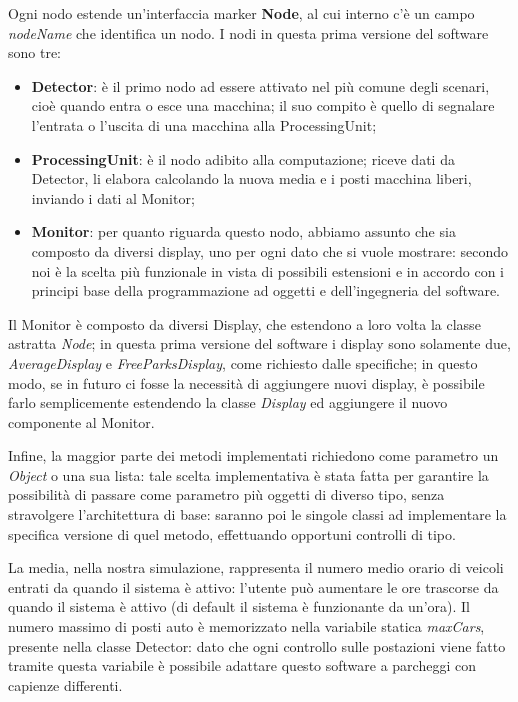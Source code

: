 \documentclass[a4paper,10pt]{article}
\begin{document}
Ogni nodo estende un'interfaccia marker \textbf{Node}, al cui interno c'è un campo \textit{nodeName} che identifica un nodo. I nodi in questa prima versione del software sono tre: 
\begin{itemize}
\item \textbf{Detector}: è il primo nodo ad essere attivato nel più comune degli scenari, cioè quando entra o esce una macchina; il suo compito è quello di segnalare l'entrata o l'uscita di una macchina alla ProcessingUnit;
\item \textbf{ProcessingUnit}: è il nodo adibito alla computazione; riceve dati da Detector, li elabora calcolando la nuova media e i posti macchina liberi, inviando i dati al Monitor;
\item \textbf{Monitor}: per quanto riguarda questo nodo, abbiamo assunto che sia composto da diversi display, uno per ogni dato che si vuole mostrare: secondo noi è la scelta più funzionale in vista di possibili estensioni e in accordo con i principi base della programmazione ad oggetti e dell'ingegneria del software.
\end{itemize}

Il Monitor è composto da diversi Display, che estendono a loro volta la classe astratta \textit{Node}; in questa prima versione del software i display sono solamente due, \textit{AverageDisplay} e \textit{FreeParksDisplay}, come richiesto dalle specifiche; in questo modo, se in futuro ci fosse la necessità di aggiungere nuovi display, è possibile farlo semplicemente estendendo la classe \textit{Display} ed aggiungere il nuovo componente al Monitor.

Infine, la maggior parte dei metodi implementati richiedono come parametro un \textit{Object} o una sua lista: tale scelta implementativa è stata fatta per garantire la possibilità di passare come parametro più oggetti di diverso tipo, senza stravolgere l'architettura di base: saranno poi le singole classi ad implementare la specifica versione di quel metodo, effettuando opportuni controlli di tipo.

La media, nella nostra simulazione, rappresenta il numero medio orario di veicoli entrati da quando il sistema è attivo: l'utente può aumentare le ore trascorse da quando il sistema è attivo (di default il sistema è funzionante da un'ora). 
Il numero massimo di posti auto è memorizzato nella variabile statica \textit{maxCars}, presente nella classe Detector: dato che ogni controllo sulle postazioni viene fatto tramite questa variabile è possibile adattare questo software a parcheggi con capienze differenti.
\end{document}
